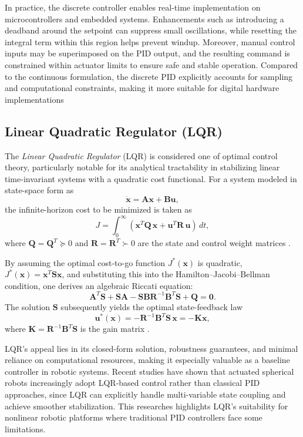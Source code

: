 \documentclass[english, bachelor, utf8]{base/thesis_telematics}
\begin{document}
In practice, the discrete controller enables real-time implementation on microcontrollers and embedded systems. Enhancements such as introducing a deadband around the setpoint can suppress small oscillations, while resetting the integral term within this region helps prevent windup. Moreover, manual control inputs may be superimposed on the PID output, and the resulting command is constrained within actuator limits to ensure safe and stable operation. Compared to the continuous formulation, the discrete PID explicitly accounts for sampling and computational constraints, making it more suitable for digital hardware implementations

\subsection{Linear Quadratic Regulator (LQR)}

The \textit{Linear Quadratic Regulator} (LQR) is considered one of optimal control theory, particularly notable for its analytical tractability in stabilizing linear time-invariant systems with a quadratic cost functional. For a system modeled in state-space form as
\[
\dot{\mathbf{x}} = \mathbf{A} \mathbf{x} + \mathbf{B} \mathbf{u},
\]
the infinite-horizon cost to be minimized is taken as
\[
J = \int_{0}^{\infty} \left( \mathbf{x}^{T} \mathbf{Q} \, \mathbf{x} + \mathbf{u}^{T} \mathbf{R} \, \mathbf{u} \right) \, dt,
\]
where \(\mathbf{Q} = \mathbf{Q}^{T} \succeq 0\) and \(\mathbf{R} = \mathbf{R}^{T} \succ 0\) are the state and control weight matrices \cite{underactuatedLQR}.

By assuming the optimal cost-to-go function \(J^*(\mathbf{x})\) is quadratic, \(J^*(\mathbf{x}) = \mathbf{x}^T \mathbf{S} \mathbf{x}\), and substituting this into the Hamilton–Jacobi–Bellman condition, one derives an algebraic Riccati equation:
\[
\mathbf{A}^T \mathbf{S} + \mathbf{S} \mathbf{A} - \mathbf{S} \mathbf{B} \mathbf{R}^{-1} \mathbf{B}^T \mathbf{S} + \mathbf{Q} = \mathbf{0}.
\]
The solution \(\mathbf{S}\) subsequently yields the optimal state-feedback law
\[
\mathbf{u}^*(\mathbf{x}) = -\mathbf{R}^{-1} \mathbf{B}^T \mathbf{S} \, \mathbf{x} = -\mathbf{K} \mathbf{x},
\]
where \(\mathbf{K} = \mathbf{R}^{-1} \mathbf{B}^T \mathbf{S}\) is the gain matrix \cite{underactuatedLQR}.

LQR's appeal lies in its closed-form solution, robustness guarantees, and minimal reliance on computational resources, making it especially valuable as a baseline controller in robotic systems. Recent studies have shown that actuated spherical robots increasingly adopt LQR-based control rather than classical PID approaches, since LQR can explicitly handle multi-variable state coupling and achieve smoother stabilization. This researches highlights LQR’s suitability for nonlinear robotic platforms where traditional PID controllers face some limitations\cite{novelsphere}.
\end{document}
